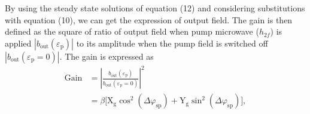 \documentclass[%
 reprint,
 amsmath,amssymb,
 aps,
prb,
]{revtex4-2}
\begin{document}
By using the steady state solutions of equation (12) and considering substitutions with equation (10), we can get the expression of output field. The gain is then  defined as the square of ratio of output field when pump microwave ($h_{2f}$) is applied  $\left|b_\mathrm{out} (\varepsilon_{\mathrm{p}})\right|$ to its amplitude when the pump field is switched off $\left|b_\mathrm{out} (\varepsilon_{\mathrm{p}}= 0)\right|$. The gain is expressed as
\begin{equation}
        \begin{split}
              \mathrm{Gain} &= \left|\frac{b_\mathrm{out}(\varepsilon_{\mathrm{p}})}{b_\mathrm{out} (\varepsilon_{\mathrm{p}}= 0)}\right|^2 \\
     &=\beta \Big[\mathrm{X}_\mathrm{g}\cos^2{(\Delta \varphi_\mathrm{sp})} + \mathrm{Y}_\mathrm{g}\sin^2{(\Delta \varphi_\mathrm{sp})}\Big], 
     \end{split}
\end{equation}
\end{document}
